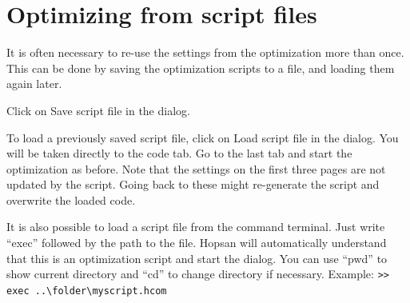 \documentclass[a4paper,pdftex]{article}
\begin{document}
\section*{Optimizing from script files}
It is often necessary to re-use the settings from the optimization more than once. This can be done by saving the optimization scripts to a file, and loading them again later.

\begin{tutenumerate}
\vspace{-\baselineskip}

Click on Save script file in the dialog.

To load a previously saved script file, click on Load script file in the dialog. You will be taken directly to the code tab. Go to the last tab and start the optimization as before. Note that the settings on the first three pages are not updated by the script. Going back to these might re-generate the script and overwrite the loaded code.

It is also possible to load a script file from the command terminal. Just write \enquote{exec} followed by the path to the file. Hopsan will automatically understand that this is an optimization script and start the dialog. You can use \enquote{pwd} to show current directory and \enquote{cd} to change directory if necessary. Example: \texttt{>{}> exec ..\textbackslash folder\textbackslash myscript.hcom}

\end{tutenumerate}
\end{document}
